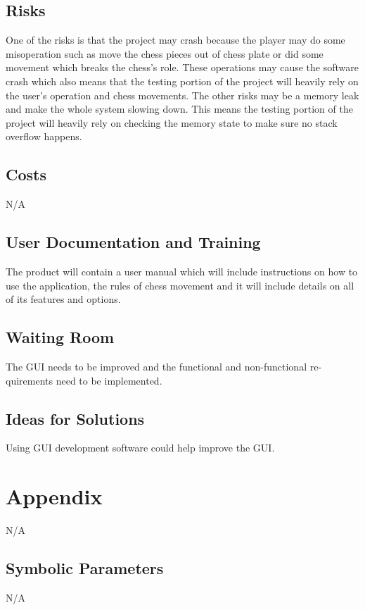 \documentclass[12pt, titlepage]{article}
\begin{document}
\subsection{Risks}
One of the risks is that the project may crash because the player may do some misoperation such as move the chess pieces out of chess plate or did some movement which breaks the chess's role. These operations may cause the software crash which also means that the testing portion of the project will heavily rely on the user's operation and chess movements. The other risks may be a memory leak and make the whole system slowing down. This means the testing portion of the project will heavily rely on checking the memory state to make sure no stack overflow happens.

\subsection{Costs}
N/A 
\subsection{User Documentation and Training}
The product will contain a user manual which will include instructions on
how to use the application, the rules of chess movement and it will include details on all of its features
and options.
\subsection{Waiting Room}
The GUI needs to be improved and the functional and non-functional re-
quirements need to be implemented.
\subsection{Ideas for Solutions}
Using GUI development software could help improve the GUI.







\newpage

\section{Appendix}
N/A 
\subsection{Symbolic Parameters}
N/A 
\end{document}
